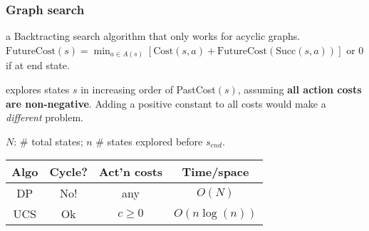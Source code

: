 \subsubsection{Graph search}

 a Backtracting search algorithm that only works
for acyclic graphs.
$\text{FutureCost}(s) = \min_{a\in A(s)}\left[\text{Cost}(s,a) + \text{FutureCost}(\text{Succ}(s,a))\right]$
or $0$ if at end state.

 explores states $s$ in increasing order of
PastCost$(s)$, assuming \textbf{all action costs are non-negative}. Adding a
positive constant to all costs would make a \emph{different} problem.

 $N$: \# total states; $n$ \# states explored before $s_{end}$.

\begin{tabular}{|c|c|c|c|} 
    \hline
    \textbf{Algo} & \textbf{Cycle?} & \textbf{Act'n costs} & \textbf{Time/space} \\
    \hline
    DP & No! & any & $O(N)$ \\ 
    \hline
    UCS & Ok & $c \ge 0$ & $O(n \log(n))$ \\
    \hline
\end{tabular}